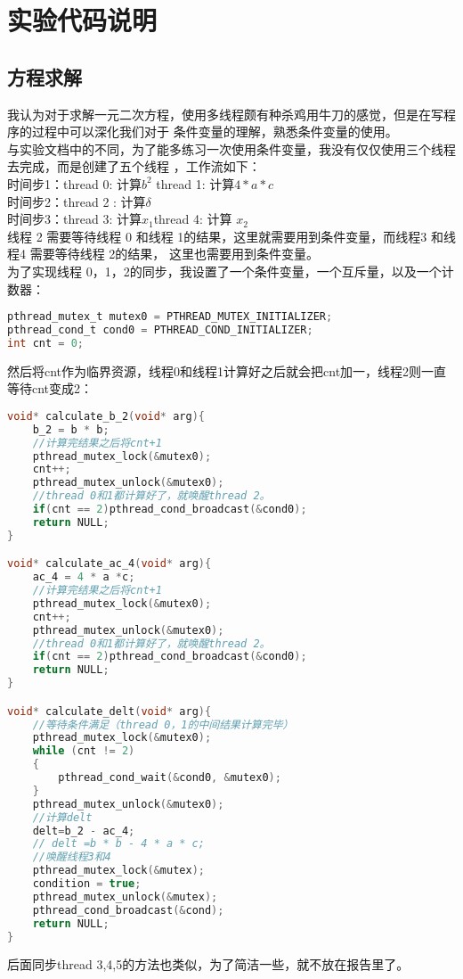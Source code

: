 \documentclass{SYSUReport}
\begin{document}
\section{实验代码说明}
\subsection{方程求解}
我认为对于求解一元二次方程，使用多线程颇有种杀鸡用牛刀的感觉，但是在写程序的过程中可以深化我们对于
条件变量的理解，熟悉条件变量的使用。\\
与实验文档中的不同，为了能多练习一次使用条件变量，我没有仅仅使用三个线程去完成，而是创建了五个线程
，工作流如下：\\
时间步1：thread 0: 计算$b^{2}$ \quad  thread 1: 计算$4*a*c$  \\
时间步2：thread 2 : 计算$\delta$\\
时间步3：thread 3: 计算$x_1$\quad thread 4: 计算 $x_2$\\
线程 2 需要等待线程 0 和线程 1的结果，这里就需要用到条件变量，而线程3 和线程4 需要等待线程 2的结果，
这里也需要用到条件变量。\\
为了实现线程 0，1，2的同步，我设置了一个条件变量，一个互斥量，以及一个计数器：
\begin{lstlisting}[language=c]
pthread_mutex_t mutex0 = PTHREAD_MUTEX_INITIALIZER;
pthread_cond_t cond0 = PTHREAD_COND_INITIALIZER;
int cnt = 0;
\end{lstlisting}
然后将cnt作为临界资源，线程0和线程1计算好之后就会把cnt加一，线程2则一直等待cnt变成2：
\begin{lstlisting}[language=c]
void* calculate_b_2(void* arg){
    b_2 = b * b;
    //计算完结果之后将cnt+1
    pthread_mutex_lock(&mutex0);
    cnt++;
    pthread_mutex_unlock(&mutex0);
    //thread 0和1都计算好了，就唤醒thread 2。
    if(cnt == 2)pthread_cond_broadcast(&cond0);
    return NULL;
}

void* calculate_ac_4(void* arg){
    ac_4 = 4 * a *c;
    //计算完结果之后将cnt+1
    pthread_mutex_lock(&mutex0);
    cnt++;
    pthread_mutex_unlock(&mutex0);
    //thread 0和1都计算好了，就唤醒thread 2。
    if(cnt == 2)pthread_cond_broadcast(&cond0);
    return NULL;
}

void* calculate_delt(void* arg){
    //等待条件满足（thread 0，1的中间结果计算完毕）
    pthread_mutex_lock(&mutex0);
    while (cnt != 2)
    {
        pthread_cond_wait(&cond0, &mutex0);
    }
    pthread_mutex_unlock(&mutex0);
    //计算delt
    delt=b_2 - ac_4;
    // delt =b * b - 4 * a * c; 
    //唤醒线程3和4
    pthread_mutex_lock(&mutex);
    condition = true;
    pthread_mutex_unlock(&mutex);
    pthread_cond_broadcast(&cond);
    return NULL;
}
\end{lstlisting}
后面同步thread 3,4,5的方法也类似，为了简洁一些，就不放在报告里了。
\end{document}
